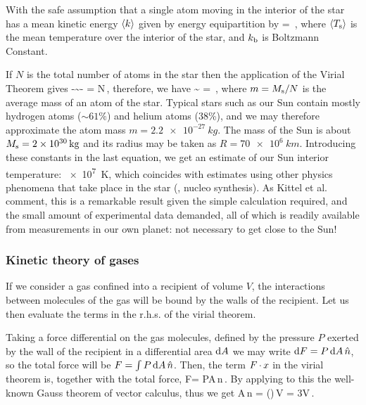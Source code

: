 With the safe assumption that a single atom moving in the interior of the star has a mean kinetic energy $\left\langle{k}\right\rangle$ given by energy equipartition by
\beq
\avg{\ken} = \boltz{}\,,
\eeq
where $\left\langle{T_\text{s}}\right\rangle$ is the mean temperature over the interior of the star, and $k_\text{b}$ is Boltzmann Constant.

If $N$ is the total number of atoms in the star then the application of the Virial Theorem gives
\beq
-\avg\pen \sim - = N\boltz{}\,,
\eeq
therefore, we have
\beq
{} \sim {} = \,,
\eeq
where $m = M_\text{s}/N$ is the average mass of an atom of the star. Typical stars such as our Sun contain mostly hydrogen atoms ($\sim 61\%$) and helium atoms (38\%), and we may therefore approximate the atom mass $m = \SI{2.2e-27}{kg}$. The mass of the Sun is about $M_\text{s} = \SI{2e30}{kg}$ and its radius may be taken as $R = \SI{70e6}{km}$. Introducing these constants in the last equation, we get an estimate of our Sun interior temperature: \SI{e7}{K}, which coincides with estimates using other physics phenomena that take place in the star (\eg, nucleo synthesis). As Kittel et al. comment, this is a remarkable result given the simple calculation required, and the small amount of experimental data demanded, all of which is readily available from measurements in our own planet: not necessary to get close to the Sun!


\subsubsection{Kinetic theory of gases}
If we consider a gas confined into a recipient of volume $V$, the interactions between molecules of the gas will be bound by the walls of the recipient. Let us then evaluate the terms in the r.h.s. of the virial theorem.

Taking a force differential on the gas molecules, defined by the pressure $P$ exerted by the wall of the recipient in a differential area $\text{d} A$ we may write $\text{d} F = P\,\text{d} A\,\hat{n}$, so the total force will be $F = \int P\,\text{d} A\,\hat{n}$. Then, the term $F\operatorname{\cdot}x$ in the virial theorem is, together with the total force,
\beq
F\iprod\pvec = P\int \pvec\iprod\dx A\,\nvec n\,.
\eeq
By applying to this the well-known Gauss theorem of vector calculus, thus we get
\beq
\int \pvec\iprod\dx A\,\nvec n = \int (\gder\iprod\pvec)\,\dx V = 3V\,.
\eeq

